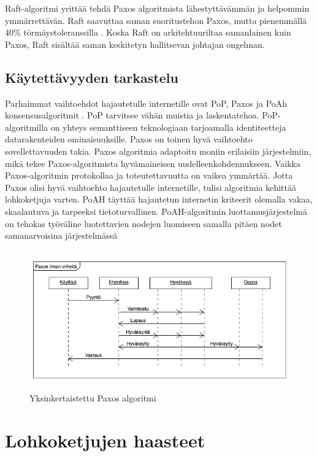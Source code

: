 \documentclass[utf8,bachelor]{gradu3}
\begin{document}
Raft-algoritmi yrittää tehdä Paxos algoritmista lähestyttävämmän ja helpommin ymmärrettävän. Raft saavuttaa saman suoritustehon Paxos, mutta pienemmällä 40\% törmäystoleranssilla \parencite{panda2019study}. 
Koska Raft on arkitehtuuriltaa samanlainen kuin Paxos, Raft sisältää saman keskitetyn hallitsevan johtajan ongelman.

\section{Käytettävyyden tarkastelu}
Parhaimmat vaihtoehdot hajautetulle internetille ovat PoP, Paxos ja PoAh konsensusalgoritmit \parencite{zarrin2021blockchain}. 
PoP tarvitsee vähän muistia ja laskentatehoa.
PoP-algoritmilla on yhteys semanttiseen teknologiaan tarjoamalla identiteetteja datarakenteiden ominaisuuksille.
Paxos on toinen hyvä vaihtoehto sovellettavuuden takia. Paxos algoritmia adaptoitu moniin erilaisiin järjestelmiin, mikä tekee Paxos-algoritmista hyvämaineisen uudelleenkohdennukseen.
Vaikka Paxos-algoritmin protokollaa ja toteutettavuutta on vaikea ymmärtää. Jotta Paxos olisi hyvä vaihtoehto hajautetulle internetille, tulisi algoritmia kehittää lohkoketjuja varten.
PoAH täyttää hajautetun internetin kriteerit olemalla vakaa, skaalautuva ja tarpeeksi tietoturvallinen. PoAH-algoritmin luottamusjärjestelmä on tehokas työväline luotettavien nodejen luomiseen samalla pitäen nodet samanarvoisina järjestelmässä

\begin{figure}[h]\centering
  \includegraphics[height=6cm,keepaspectratio]{PaxosDiag}
  \caption[Yksinkertaistettu Paxos algoritmi]{Yksinkertaistettu Paxos algoritmi}
  \label{fig:Paxos}
\end{figure}

\chapter{Lohkoketjujen haasteet}\label{Haasteet}
\end{document}

